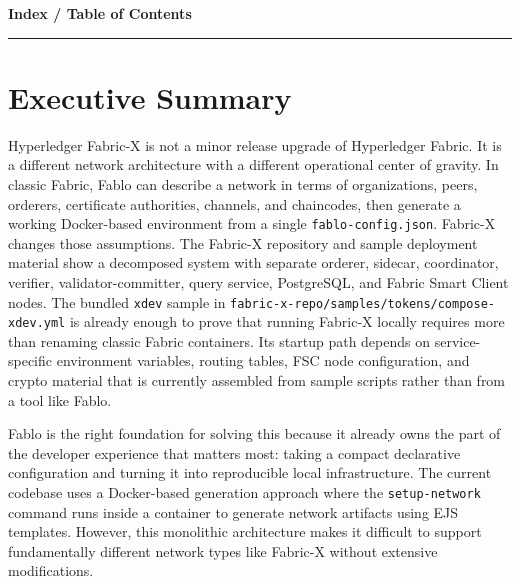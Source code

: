 \vspace{0.5cm}

\begin{center}
    {\Large\bfseries\color{primary} Index / Table of Contents}
\end{center}

\vspace{0.2cm}
\begin{center}
    \textcolor{secondary}{\rule{0.5\textwidth}{0.3pt}}
\end{center}
\vspace{0.3cm}

\tableofcontents

\newpage
\section{Executive Summary}

Hyperledger Fabric-X is not a minor release upgrade of Hyperledger Fabric. It is a different network architecture with a different operational center of gravity. In classic Fabric, Fablo can describe a network in terms of organizations, peers, orderers, certificate authorities, channels, and chaincodes, then generate a working Docker-based environment from a single \texttt{fablo-config.json}. Fabric-X changes those assumptions. The Fabric-X repository and sample deployment material show a decomposed system with separate orderer, sidecar, coordinator, verifier, validator-committer, query service, PostgreSQL, and Fabric Smart Client nodes. The bundled \texttt{xdev} sample in \texttt{fabric-x-repo/samples/tokens/compose-xdev.yml} is already enough to prove that running Fabric-X locally requires more than renaming classic Fabric containers. Its startup path depends on service-specific environment variables, routing tables, FSC node configuration, and crypto material that is currently assembled from sample scripts rather than from a tool like Fablo.

Fablo is the right foundation for solving this because it already owns the part of the developer experience that matters most: taking a compact declarative configuration and turning it into reproducible local infrastructure. The current codebase uses a Docker-based generation approach where the \texttt{setup-network} command runs inside a container to generate network artifacts using EJS templates. However, this monolithic architecture makes it difficult to support fundamentally different network types like Fabric-X without extensive modifications.

